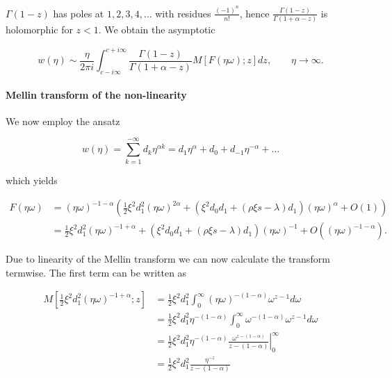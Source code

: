\documentclass[12pt]{article}
\theoremstyle{plain}
\begin{document}
$\Gamma(1-z)$ has poles at $1, 2, 3, 4, \dots$ with residues $\frac{(-1)^{n}}{n !}$, hence $\frac{\Gamma(1-z)}{\Gamma(1+\alpha-z)}$ is holomorphic for $z < 1$. We obtain the asymptotic 

\begin{equation} \label{eq: ultimate mellin}
w(\eta) \sim \frac{\eta}{2 \pi i} \int_{c-i \infty}^{c+i \infty} \frac{\Gamma(1-z)}{\Gamma(1+\alpha-z)} M[F(\eta \omega) ; z] d z, \qquad \eta \rightarrow \infty.
\end{equation}

\paragraph{Mellin transform of the non-linearity}

We now employ the ansatz

\begin{equation} \label{eq: mellin ansatz}
w(\eta) = \sum_{k=1}^{-\infty} d_k \eta^{\alpha k} = d_1 \eta^\alpha + d_0 + d_{-1} \eta ^ {-\alpha} + \dots
\end{equation}

which yields

$$
\begin{aligned}
F(\eta\omega) &= (\eta\omega)^{-1-\alpha}\left(\frac 12 \xi^2 d_1^2  (\eta\omega)^{2\alpha} + (\xi^2 d_0d_1 + (\rho\xi s - \lambda) d_1)(\eta\omega)^{\alpha} + O(1)\right)\\
&= \frac 12 \xi^2 d_1^2  (\eta\omega)^{-1+\alpha} + (\xi^2 d_0d_1 + (\rho\xi s - \lambda) d_1)(\eta\omega)^{-1} + O((\eta\omega)^{-1-\alpha}).
\end{aligned}
$$

Due to linearity of the Mellin transform we can now calculate the transform termwise. The first term can be written as

$$
\begin{aligned}
M\left[\frac{1}{2} \xi^{2} d_{1}^{2} (\eta\omega)^{-1+\alpha}; z\right] &= \frac{1}{2} \xi^{2} d_{1}^{2} \int _0 ^\infty (\eta \omega) ^ {-(1-\alpha)} \omega ^{z-1} d\omega \\
&= \frac{1}{2} \xi^{2} d_{1}^{2} \eta ^{-(1-\alpha)}\int _0 ^\infty \omega ^ {-(1-\alpha)} \omega ^{z-1} d\omega \\
&= \frac{1}{2} \xi^{2} d_{1}^{2} \eta ^{-(1-\alpha)} \left. \frac{\omega^{z-(1-\alpha)}}{z-(1-\alpha)} \right|^\infty _0 \\
&= \frac{1}{2} \xi^{2} d_{1}^{2} \frac{\eta ^{-z}}{z-(1-\alpha)}
\end{aligned}
$$
\end{document}
